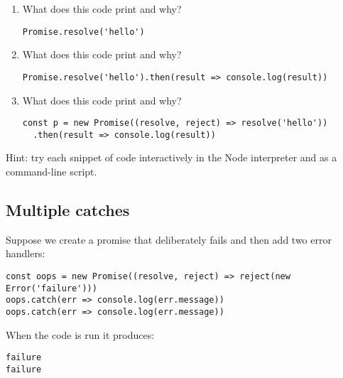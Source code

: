 \documentclass[krantzl]{krantz}
\begin{document}
\begin{enumerate}

\item 

What does this code print and why?

\begin{lstlisting}[frame=tblr]
Promise.resolve('hello')
\end{lstlisting}



\item 

What does this code print and why?

\begin{lstlisting}[frame=tblr]
Promise.resolve('hello').then(result => console.log(result))
\end{lstlisting}



\item 

What does this code print and why?

\begin{lstlisting}[frame=tblr]
const p = new Promise((resolve, reject) => resolve('hello'))
  .then(result => console.log(result))
\end{lstlisting}



\end{enumerate}


Hint: try each snippet of code interactively in the Node interpreter and as a command-line script.

\subsection*{Multiple catches}


Suppose we create a promise that deliberately fails and then add two error handlers:


\begin{lstlisting}[frame=tblr]
const oops = new Promise((resolve, reject) => reject(new Error('failure')))
oops.catch(err => console.log(err.message))
oops.catch(err => console.log(err.message))
\end{lstlisting}



\noindent When the code is run it produces:


\begin{lstlisting}[frame=tblr,backgroundcolor=\color{black!5}]
failure
failure
\end{lstlisting}
\end{document}
